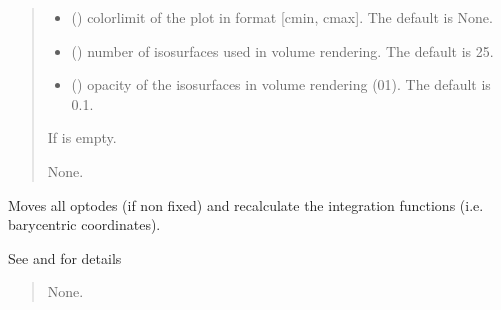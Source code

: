 \documentclass[letterpaper,10pt,english]{sphinxmanual}
\begin{document}
\begin{fulllineitems}
\begin{fulllineitems}
\begin{quote}
\begin{description}
\begin{itemize}
\item {} 
\sphinxAtStartPar
{} (\sphinxstyleliteralemphasis{\sphinxupquote{, }}) \textendash{} colorlimit of the plot in format {[}cmin, cmax{]}. The default is None.

\item {} 
\sphinxAtStartPar
{} (\sphinxstyleliteralemphasis{\sphinxupquote{, }}) \textendash{} number of isosurfaces used in volume rendering. The default is 25.

\item {} 
\sphinxAtStartPar
{} (\sphinxstyleliteralemphasis{\sphinxupquote{, }}) \textendash{} opacity of the isosurfaces in volume rendering (0\sphinxhyphen{}1). The default is 0.1.

\end{itemize}

\sphinxAtStartPar
{} \textendash{} If  is empty.

\sphinxAtStartPar
None.

\end{description}\end{quote}

\end{fulllineitems}


\begin{fulllineitems}
\label{\detokenize{_autosummary/nirfasterff.base.mesh.mesh:nirfasterff.base.mesh.mesh.touch_optodes}}
\pysigstartsignatures
\pysiglinewithargsret
{}
{}
{}
\pysigstopsignatures
\sphinxAtStartPar
Moves all optodes (if non fixed) and recalculate the integration functions (i.e. barycentric coordinates).

\sphinxAtStartPar
See {\hyperref[\detokenize{_autosummary/nirfasterff.base.optodes.optode:nirfasterff.base.optodes.optode.touch_sources}]{}} and {\hyperref[\detokenize{_autosummary/nirfasterff.base.optodes.optode:nirfasterff.base.optodes.optode.touch_detectors}]{}} for details
\begin{quote}\begin{description}
\sphinxAtStartPar
None.


\end{description}
\end{quote}
\end{fulllineitems}
\end{fulllineitems}
\end{document}
